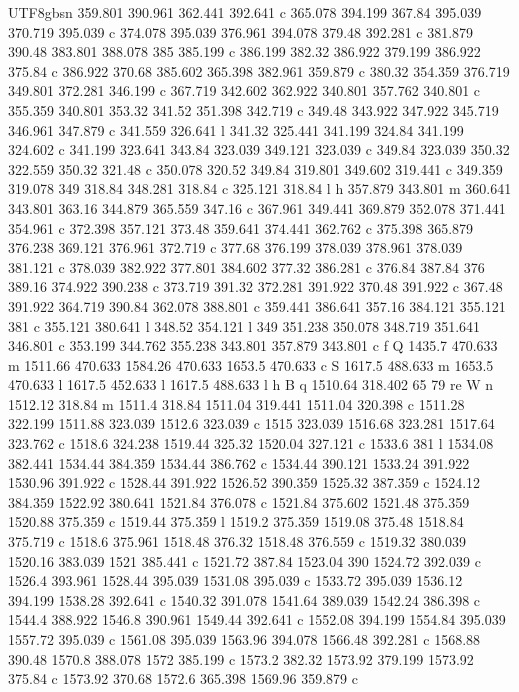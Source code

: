 \documentclass[11pt,a4paper,oneside]{report}
\begin{document}
\begin{CJK*}{UTF8}{gbsn}
{359.801 390.961 362.441 392.641 c 365.078 394.199 367.84 395.039 370.719 395.039 c 374.078 395.039
376.961 394.078 379.48 392.281 c 381.879 390.48 383.801 388.078 385 385.199 c 386.199 382.32 386.922
379.199 386.922 375.84 c 386.922 370.68 385.602 365.398 382.961 359.879 c 380.32 354.359 376.719 349.801
372.281 346.199 c 367.719 342.602 362.922 340.801 357.762 340.801 c 355.359 340.801 353.32 341.52 351.398
342.719 c 349.48 343.922 347.922 345.719 346.961 347.879 c 341.559 326.641 l 341.32 325.441 341.199
324.84 341.199 324.602 c 341.199 323.641 343.84 323.039 349.121 323.039 c 349.84 323.039 350.32 322.559
350.32 321.48 c 350.078 320.52 349.84 319.801 349.602 319.441 c 349.359 319.078 349 318.84 348.281 318.84
c 325.121 318.84 l h 357.879 343.801 m 360.641 343.801 363.16 344.879 365.559 347.16 c 367.961 349.441
369.879 352.078 371.441 354.961 c 372.398 357.121 373.48 359.641 374.441 362.762 c 375.398 365.879
376.238 369.121 376.961 372.719 c 377.68 376.199 378.039 378.961 378.039 381.121 c 378.039 382.922
377.801 384.602 377.32 386.281 c 376.84 387.84 376 389.16 374.922 390.238 c 373.719 391.32 372.281
391.922 370.48 391.922 c 367.48 391.922 364.719 390.84 362.078 388.801 c 359.441 386.641 357.16 384.121
355.121 381 c 355.121 380.641 l 348.52 354.121 l 349 351.238 350.078 348.719 351.641 346.801 c 353.199
344.762 355.238 343.801 357.879 343.801 c f Q 1435.7 470.633 m 1511.66 470.633 1584.26 470.633 1653.5
470.633 c S 1617.5 488.633 m 1653.5 470.633 l 1617.5 452.633 l 1617.5 488.633 l h B q 1510.64 318.402 65
79 re W n 1512.12 318.84 m 1511.4 318.84 1511.04 319.441 1511.04 320.398 c 1511.28 322.199 1511.88
323.039 1512.6 323.039 c 1515 323.039 1516.68 323.281 1517.64 323.762 c 1518.6 324.238 1519.44 325.32
1520.04 327.121 c 1533.6 381 l 1534.08 382.441 1534.44 384.359 1534.44 386.762 c 1534.44 390.121 1533.24
391.922 1530.96 391.922 c 1528.44 391.922 1526.52 390.359 1525.32 387.359 c 1524.12 384.359 1522.92
380.641 1521.84 376.078 c 1521.84 375.602 1521.48 375.359 1520.88 375.359 c 1519.44 375.359 l 1519.2
375.359 1519.08 375.48 1518.84 375.719 c 1518.6 375.961 1518.48 376.32 1518.48 376.559 c 1519.32 380.039
1520.16 383.039 1521 385.441 c 1521.72 387.84 1523.04 390 1524.72 392.039 c 1526.4 393.961 1528.44
395.039 1531.08 395.039 c 1533.72 395.039 1536.12 394.199 1538.28 392.641 c 1540.32 391.078 1541.64
389.039 1542.24 386.398 c 1544.4 388.922 1546.8 390.961 1549.44 392.641 c 1552.08 394.199 1554.84 395.039
1557.72 395.039 c 1561.08 395.039 1563.96 394.078 1566.48 392.281 c 1568.88 390.48 1570.8 388.078 1572
385.199 c 1573.2 382.32 1573.92 379.199 1573.92 375.84 c 1573.92 370.68 1572.6 365.398 1569.96 359.879 c
}
\end{CJK*}
\end{document}
